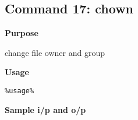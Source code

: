 \subsection{Command 17: chown} 
\textbf{Purpose}
\begin{flushleft}
 change file owner and group
\end{flushleft}
\textbf{Usage}
\begin{verbatim}
%usage%
\end{verbatim}
\textbf{Sample i/p and o/p}
\begin{figure}[H] 
\end{figure}
